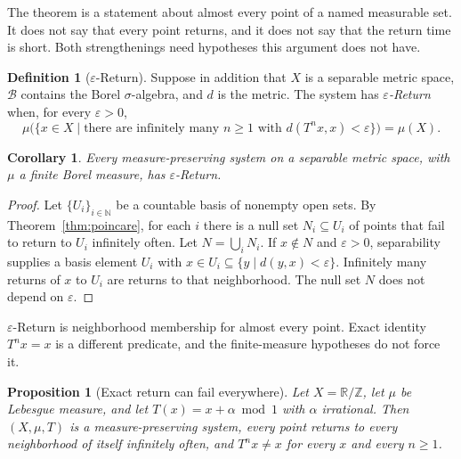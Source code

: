 \documentclass[11pt]{article}
\newcommand{\Nat}{\mathbb{N}}
\newcommand{\ZZ}{\mathbb{Z}}
\newcommand{\RR}{\mathbb{R}}
\newtheorem{proposition}[theorem]{Proposition}
\newtheorem{corollary}[theorem]{Corollary}
\theoremstyle{definition}
\newtheorem{definition}[theorem]{Definition}
\theoremstyle{remark}
\begin{document}
The theorem is a statement about almost every point of a named measurable set.
It does not say that every point returns, and it does not say that the return time is short.
Both strengthenings need hypotheses this argument does not have.

\begin{definition}[\(\varepsilon\)-Return]
\label{def:epsilon}
Suppose in addition that \(X\) is a separable metric space, \(\mathcal{B}\) contains the Borel \(\sigma\)-algebra, and \(d\) is the metric.
The system has \emph{\(\varepsilon\)-Return} when, for every \(\varepsilon>0\),
\[
\mu\bigl(\{x\in X \mid \text{there are infinitely many } n\geq 1 \text{ with } d(T^{n}x,x)<\varepsilon\}\bigr)
= \mu(X).
\]
\end{definition}

\begin{corollary}
\label{cor:epsilon}
Every measure-preserving system on a separable metric space, with \(\mu\) a finite Borel measure, has \(\varepsilon\)-Return.
\end{corollary}

\begin{proof}
Let \(\{U_i\}_{i\in\Nat}\) be a countable basis of nonempty open sets.
By Theorem~\ref{thm:poincare}, for each \(i\) there is a null set \(N_i\subseteq U_i\) of points that fail to return to \(U_i\) infinitely often.
Let \(N=\bigcup_i N_i\).
If \(x\notin N\) and \(\varepsilon>0\), separability supplies a basis element \(U_i\) with \(x\in U_i\subseteq\{y\mid d(y,x)<\varepsilon\}\).
Infinitely many returns of \(x\) to \(U_i\) are returns to that neighborhood.
The null set \(N\) does not depend on \(\varepsilon\).
\end{proof}

\(\varepsilon\)-Return is neighborhood membership for almost every point.
Exact identity \(T^{n}x=x\) is a different predicate, and the finite-measure hypotheses do not force it.

\begin{proposition}[Exact return can fail everywhere]
\label{prop:rotation}
Let \(X=\RR/\ZZ\), let \(\mu\) be Lebesgue measure, and let \(T(x)=x+\alpha \bmod 1\) with \(\alpha\) irrational.
Then \((X,\mu,T)\) is a measure-preserving system, every point returns to every neighborhood of itself infinitely often, and \(T^{n}x\neq x\) for every \(x\) and every \(n\geq 1\).
\end{proposition}
\end{document}
